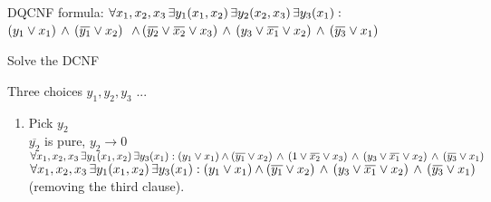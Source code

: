 \documentclass[xcolor=table	]{beamer}
\newcommand{\ov}[1]{\mkern 1.5mu\overline{\mkern-1.5mu#1\mkern-1.5mu}\mkern 1.5mu}
\begin{document}
\begin{frame}{}
\begin{alertblock}{DQCNF formula:}
	{
		$\forall x_1,x_2,x_3 \, \exists y_1(x_1,x_2) \, \exists y_2(x_2,x_3) \, \exists y_3(x_1) : \newline$
		$(y_{1} \vee x_1) \, \wedge \, (\ov{y_1} \vee x_2)  \newline$ 
		$ \, \wedge \, (\ov{y_2} \vee \ov{x_2} \vee x_3)  \newline \, \wedge \, (y_3 \vee \ov{x_1} \vee x_2) \, \wedge \, (\ov{y_3} \vee x_1)$
		\vspace{0.2cm}
	}
\end{alertblock}
\begin{exampleblock}{Solve the DCNF}
	{   \only Three choices $y_1, y_2, y_3$ ...
		\pause 
		\begin{enumerate}
		\only \item Pick $y_2$\\
		\pause 
		  $\overline{y_2}$ is pure, $y_2 \rightarrow 0$ \newline 
		\pause 
		$\forall x_1,x_2,x_3 \, \exists y_1(x_1,x_2) \, \exists y_3(x_1)  : (y_1 \vee x_1) \wedge (\overline{y_1} \vee x_2)
		\, \wedge \, (1 \vee \ov{x_2} \vee x_3)  \, \wedge \, (y_3 \vee \ov{x_1} \vee x_2) \, \wedge \, (\ov{y_3} \vee x_1) \newline$ \\ 
        \pause 
        $\forall x_1,x_2,x_3 \, \exists y_1(x_1,x_2) \, \exists y_3(x_1)  : (y_1 \vee x_1) \wedge (\overline{y_1} \vee x_2)
        \, \wedge \, (y_3 \vee \ov{x_1} \vee x_2) \, \wedge \, (\ov{y_3} \vee x_1)$ \\ 
	    (removing the third clause).
		\end{enumerate}
	}
\end{exampleblock}

\end{frame}
\end{document}
